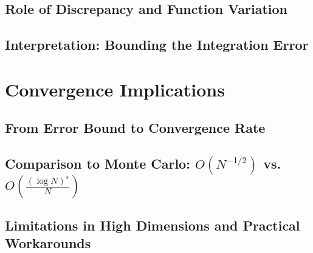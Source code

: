   \subsection{Role of Discrepancy and Function Variation}



  \subsection{Interpretation: Bounding the Integration Error}



\section{Convergence Implications}



  \subsection{From Error Bound to Convergence Rate}



  \subsection{Comparison to Monte Carlo: $O(N^{-1/2})$ vs. $O\left(\frac{(\log N)^s}{N}\right)$}



  \subsection{Limitations in High Dimensions and Practical Workarounds}
